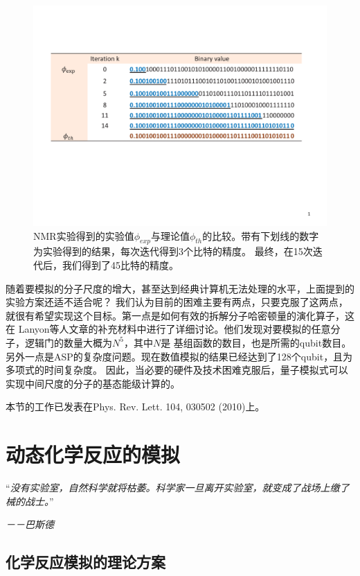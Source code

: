 \begin{figure}[htbp]
            \begin{center}
              \includegraphics[width= 0.8\columnwidth]{figures/nmrhydroresult.pdf}
              \caption{NMR实验得到的实验值$\phi_{exp}$与理论值$\phi_{th}$的比较。带有下划线的数字为实验得到的结果，每次迭代得到3个比特的精度。
              最终，在15次迭代后，我们得到了45比特的精度。}\label{nmrhydroresult}
            \end{center}
 \end{figure}

 随着要模拟的分子尺度的增大，甚至达到经典计算机无法处理的水平，上面提到的实验方案还适不适合呢？
 我们认为目前的困难主要有两点，只要克服了这两点，就很有希望实现这个目标。第一点是如何有效的拆解分子哈密顿量的演化算子，这在
 Lanyon等人文章的补充材料\cite{optics_static}中进行了详细讨论。他们发现对要模拟的任意分子，逻辑门的数量大概为$N^5$，其中$N$是
 基组函数的数目，也是所需的qubit数目。另外一点是ASP的复杂度问题。现在数值模拟的结果已经达到了128个qubit\cite{hydro5}，且为多项式的时间复杂度。
 因此，当必要的硬件及技术困难克服后，量子模拟式可以实现中间尺度的分子的基态能级计算的。

本节的工作已发表在Phys. Rev. Lett. 104, 030502 (2010)\cite{static}上。

\section{动态化学反应的模拟}

“\emph{没有实验室，自然科学就将枯萎。科学家一旦离开实验室，就变成了战场上缴了械的战士。}”

 \hspace{23em} \emph{－－巴斯德}

 \subsection{化学反应模拟的理论方案}

